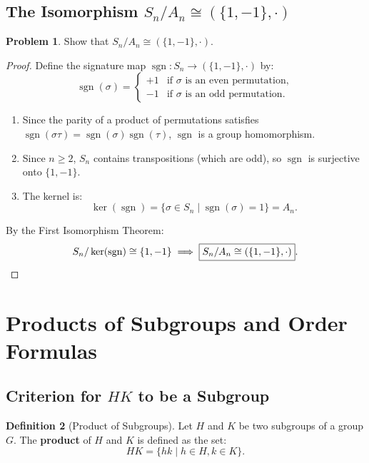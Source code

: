 \documentclass[12pt]{article}
\theoremstyle{definition}
\newtheorem{definition}{Definition}[section]
\newtheorem{problem}[definition]{Problem}
\theoremstyle{plain}
\begin{document}
\subsection{The Isomorphism \texorpdfstring{$S_n/A_n \cong (\{1, -1\}, \cdot)$}{Sn/An isomorphic to {1,-1}}}

\begin{problem}
Show that $S_n/A_n \cong (\{1, -1\}, \cdot)$.
\end{problem}

\begin{proof}
Define the signature map $\operatorname{sgn}: S_n \to (\{1, -1\}, \cdot)$ by:
\[
\operatorname{sgn}(\sigma) = \begin{cases}
+1 & \text{if } \sigma \text{ is an even permutation}, \\
-1 & \text{if } \sigma \text{ is an odd permutation}.
\end{cases}
\]
\begin{enumerate}
    \item Since the parity of a product of permutations satisfies $\operatorname{sgn}(\sigma \tau) = \operatorname{sgn}(\sigma) \operatorname{sgn}(\tau)$, $\operatorname{sgn}$ is a group homomorphism.
    \item Since $n \ge 2$, $S_n$ contains transpositions (which are odd), so $\operatorname{sgn}$ is surjective onto $\{1, -1\}$.
    \item The kernel is:
    \[
    \ker(\operatorname{sgn}) = \{ \sigma \in S_n \mid \operatorname{sgn}(\sigma) = 1 \} = A_n.
    \]
\end{enumerate}
By the First Isomorphism Theorem:
\[
S_n/\ker(\operatorname{sgn}) \cong \{1, -1\} \implies \boxed{S_n/A_n \cong (\{1, -1\}, \cdot)}. \qedhere
\]
\end{proof}

\newpage
\section{Products of Subgroups and Order Formulas}

\subsection{Criterion for \texorpdfstring{$HK$}{HK} to be a Subgroup}

\begin{definition}[Product of Subgroups]
Let $H$ and $K$ be two subgroups of a group $G$. The \textbf{product} of $H$ and $K$ is defined as the set:
\[
HK = \{ hk \mid h \in H, k \in K \}.
\]
\end{definition}
\end{document}
